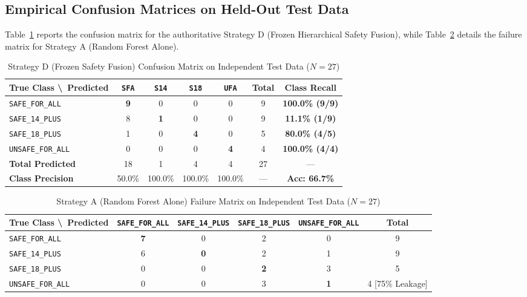 \documentclass[12pt,a4paper]{report}
\begin{document}
\subsection{Empirical Confusion Matrices on Held-Out Test Data}
Table~\ref{tab:p10d_strategy_d_cm} reports the confusion matrix for the authoritative Strategy D (Frozen Hierarchical Safety Fusion), while Table~\ref{tab:p10d_strategy_a_cm} details the failure matrix for Strategy A (Random Forest Alone).

\begin{table}[htbp]
\centering
\small
\caption{Strategy D (Frozen Safety Fusion) Confusion Matrix on Independent Test Data ($N=27$)}
\label{tab:p10d_strategy_d_cm}
\begin{tabular}{|l|c|c|c|c|c|c|}
\hline
\textbf{True Class \textbackslash\ Predicted} & \texttt{SFA} & \texttt{S14} & \texttt{S18} & \texttt{UFA} & \textbf{Total} & \textbf{Class Recall} \\
\hline
\texttt{SAFE\_FOR\_ALL} & \textbf{9} & 0 & 0 & 0 & 9 & \textbf{100.0\% (9/9)} \\
\hline
\texttt{SAFE\_14\_PLUS} & 8 & \textbf{1} & 0 & 0 & 9 & \textbf{11.1\% (1/9)} \\
\hline
\texttt{SAFE\_18\_PLUS} & 1 & 0 & \textbf{4} & 0 & 5 & \textbf{80.0\% (4/5)} \\
\hline
\texttt{UNSAFE\_FOR\_ALL} & 0 & 0 & 0 & \textbf{4} & 4 & \textbf{100.0\% (4/4)} \\
\hline
\textbf{Total Predicted} & 18 & 1 & 4 & 4 & 27 & --- \\
\hline
\textbf{Class Precision} & 50.0\% & 100.0\% & 100.0\% & 100.0\% & --- & \textbf{Acc: 66.7\%} \\
\hline
\end{tabular}
\end{table}

\begin{table}[htbp]
\centering
\small
\caption{Strategy A (Random Forest Alone) Failure Matrix on Independent Test Data ($N=27$)}
\label{tab:p10d_strategy_a_cm}
\begin{tabular}{|l|c|c|c|c|c|}
\hline
\textbf{True Class \textbackslash\ Predicted} & \texttt{SAFE\_FOR\_ALL} & \texttt{SAFE\_14\_PLUS} & \texttt{SAFE\_18\_PLUS} & \texttt{UNSAFE\_FOR\_ALL} & \textbf{Total} \\
\hline
\texttt{SAFE\_FOR\_ALL} & \textbf{7} & 0 & 2 & 0 & 9 \\
\hline
\texttt{SAFE\_14\_PLUS} & 6 & \textbf{0} & 2 & 1 & 9 \\
\hline
\texttt{SAFE\_18\_PLUS} & 0 & 0 & \textbf{2} & 3 & 5 \\
\hline
\texttt{UNSAFE\_FOR\_ALL} & 0 & 0 & 3 & \textbf{1} & 4 [75\% Leakage] \\
\hline
\end{tabular}
\end{table}
\end{document}
